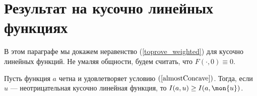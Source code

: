 \section{Результат на кусочно линейных функциях}


В этом параграфе мы докажем неравенство (\ref{toprove_weighted}) для кусочно линейных функций.
Не умаляя общности, будем считать, что $F(\cdot, 0) \equiv 0$.

\begin{theorem}
\label{linth}
Пусть функция $a$ четна и удовлетворяет условию $(\ref{almostConcave})$.
Тогда, если $u$ --- неотрицательная кусочно линейная функция, то $I(a, u) \ge I(a, \mon{u})$.
\end{theorem}

